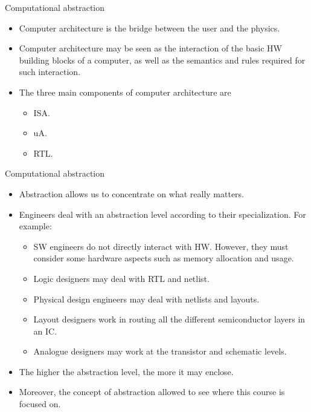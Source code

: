 \begin{frame}{Computational abstraction}
\begin{itemize}
  \item Computer architecture is the bridge between the user and the physics.
  \item Computer architecture may be seen as the interaction of the basic \ac{HW} building blocks of a computer, as well as the semantics and rules required for such interaction.
  \item The three main components of computer architecture are
    \begin{itemize}
      \item \ac{ISA}.
      \item \ac{uA}.
      \item \ac{RTL}.
    \end{itemize}       
\end{itemize}
\end{frame}

\begin{frame}{Computational abstraction}
\begin{itemize}
\item Abstraction allows us to concentrate on what really matters. 
\item Engineers deal with an abstraction level according to their specialization. For example:
  \begin{itemize}
    \item \ac{SW} engineers do not directly interact with \ac{HW}. However, they must consider some hardware aspects such as memory allocation and usage.
    \item Logic designers may deal with \ac{RTL} and netlist.
    \item Physical design engineers may deal with netlists and layouts.
    \item Layout designers work in routing all the different semiconductor layers in an \ac{IC}.
    \item Analogue designers may work at the transistor and schematic levels.
  \end{itemize}
  \item The higher the abstraction level, the more it may enclose.
  \item Moreover, the concept of abstraction allowed to see where this course is focused on.
\end{itemize}
\end{frame}


%
